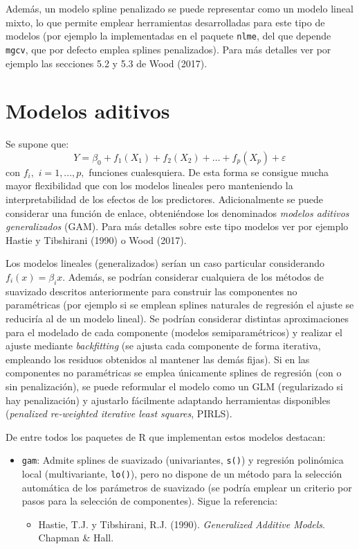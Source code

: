 \documentclass[
]{book}
\providecommand{\tightlist}{%
  \setlength{\itemsep}{0pt}\setlength{\parskip}{0pt}}
\theoremstyle{break}
\theoremstyle{definition}
\theoremstyle{definition}
\theoremstyle{definition}
\theoremstyle{remark}
\begin{document}
Además, un modelo spline penalizado se puede representar como un modelo lineal mixto, lo que permite emplear herramientas desarrolladas para este tipo de modelos (por ejemplo la implementadas en el paquete \texttt{nlme}, del que depende \texttt{mgcv}, que por defecto emplea splines penalizados).
Para más detalles ver por ejemplo las secciones 5.2 y 5.3 de Wood (2017).

\hypertarget{modelos-aditivos}{%
\section{Modelos aditivos}\label{modelos-aditivos}}

Se supone que:
\[Y= \beta_{0} + f_1(X_1) + f_2(X_2) + \ldots + f_p(X_p)  + \varepsilon\]
con \(f_{i},\) \(i=1,...,p,\) funciones cualesquiera.
De esta forma se consigue mucha mayor flexibilidad que con los modelos lineales pero manteniendo la interpretabilidad de los efectos de los predictores.
Adicionalmente se puede considerar una función de enlace, obteniéndose los denominados \emph{modelos aditivos generalizados} (GAM). Para más detalles sobre este tipo modelos ver por ejemplo Hastie y Tibshirani (1990) o Wood (2017).

Los modelos lineales (generalizados) serían un caso particular considerando \(f_{i}(x) = \beta_{i}x\).
Además, se podrían considerar cualquiera de los métodos de suavizado descritos anteriormente para construir las componentes no paramétricas (por ejemplo si se emplean splines naturales de regresión el ajuste se reduciría al de un modelo lineal).
Se podrían considerar distintas aproximaciones para el modelado de cada componente (modelos semiparamétricos) y realizar el ajuste mediante \emph{backfitting} (se ajusta cada componente de forma iterativa, empleando los residuos obtenidos al mantener las demás fijas).
Si en las componentes no paramétricas se emplea únicamente splines de regresión (con o sin penalización), se puede reformular el modelo como un GLM (regularizado si hay penalización) y ajustarlo fácilmente adaptando herramientas disponibles (\emph{penalized re-weighted iterative least squares}, PIRLS).

De entre todos los paquetes de R que implementan estos modelos destacan:

\begin{itemize}
\item
  \texttt{gam}: Admite splines de suavizado (univariantes, \texttt{s()}) y regresión polinómica local (multivariante, \texttt{lo()}), pero no dispone de un método para la selección automática de los parámetros de suavizado (se podría emplear un criterio por pasos para la selección de componentes).
  Sigue la referencia:

  \begin{itemize}
  \tightlist
  \item
    Hastie, T.J. y Tibshirani, R.J. (1990). \emph{Generalized Additive Models}. Chapman \& Hall.
  \end{itemize}
\end{itemize}
\end{document}
